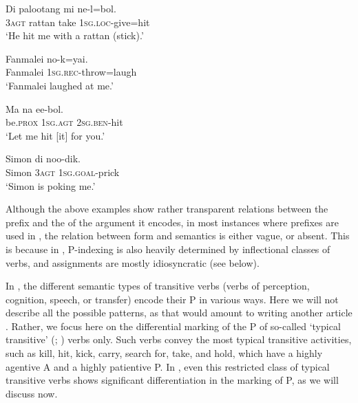 \documentclass[output=paper]{LSP/langsci}
\begin{document}
\ex \label{03-kl-ex:18}
\gll Di palootang mi ne-l=bol.\\
3\textsc{agt} rattan take 1\textsc{sg}.\textsc{loc}-give=hit\\
\glt ‘He hit me with a rattan (stick).’

\ex \label{03-kl-ex:19}
\gll Fanmalei no-k=yai.\\
Fanmalei 1\textsc{sg}.\textsc{rec}-throw=laugh\\
\glt ‘Fanmalei laughed at me.’

\ex\label{03-kl-ex:20}
\gll Ma na ee-bol.\\
be.\textsc{prox} 1\textsc{sg}.\textsc{agt} 2\textsc{sg}.\textsc{ben}-hit\\
\glt ‘Let me hit [it] for you.’

\ex \label{03-kl-ex:21}
\gll Simon di noo-dik.\\
Simon 3\textsc{agt} 1\textsc{sg}.\textsc{goal}-prick\\
\glt ‘Simon is poking me.’
\z
\z


Although the above examples show rather transparent relations between the prefix and the  of the argument it encodes, in most instances where prefixes are used in , the relation between form and semantics is either vague, or absent. This is because in , P-indexing is also heavily determined by inflectional classes of verbs, and  assignments are mostly idiosyncratic (see below). 

In , the different semantic types of transitive verbs (\eg verbs
of perception, cognition, speech, or transfer) encode their P in
various ways. Here we will not describe all the possible patterns, as
that would amount to writing another article \citep[see][]{Kratochvil2007Grammar,Kratochvil2011Transitivity,Kratochvil2014Differential,Kratochviletal2015Degrees}. Rather, we focus here on the differential marking of the P of so-called ‘typical transitive’ (\citealt[111]{Comrie1989Language}; \citealt[545]{Haspelmath2011S}) verbs only. Such verbs convey the most typical transitive activities, such as kill, hit, kick, carry, search for, take, and hold, which have a highly agentive A and a highly patientive P. In , even this restricted class of typical transitive verbs shows significant differentiation in the marking of P, as we will discuss now.
\end{document}
